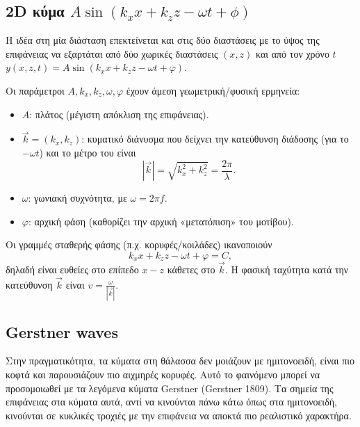\documentclass[a4paper, 11pt]{article}
\begin{document}
\subsection{\texorpdfstring{2D κύμα
\(A\sin(k_x x + k_z z - \omega t + \phi)\)}{2D κύμα A\textbackslash sin(k\_x x + k\_z z - \textbackslash omega t + \textbackslash phi)}}\label{d-ux3baux3cdux3bcux3b1-asink_x-x-k_z-z---omega-t-phi}

Η ιδέα στη μία διάσταση επεκτείνεται και στις δύο διαστάσεις με το ύψος
της επιφάνειας να εξαρτάται από δύο χωρικές διαστάσεις \((x,z)\) και από
τον χρόνο \(t\) \(y(x,z,t)=A\sin(k_x x + k_z z - \omega t + \varphi)\).

Οι παράμετροι \(A, k_x, k_z, \omega, \varphi\) έχουν άμεση
γεωμετρική/φυσική ερμηνεία:

\begin{itemize}
\item
  \(A\): πλάτος (μέγιστη απόκλιση της επιφάνειας).
\item
  \(\vec{k}=(k_x,k_z)\): κυματικό διάνυσμα που δείχνει την κατεύθυνση
  διάδοσης (για το \(-\omega t\)) και το μέτρο του είναι \[
  |\vec{k}|=\sqrt{k_x^2+k_z^2}=\frac{2\pi}{\lambda}.
  \]
\item
  \(\omega\): γωνιακή συχνότητα, με \(\omega=2\pi f\).
\item
  \(\varphi\): αρχική φάση (καθορίζει την αρχική «μετατόπιση» του
  μοτίβου).
\end{itemize}

Οι γραμμές σταθερής φάσης (π.χ. κορυφές/κοιλάδες) ικανοποιούν \[
k_x x + k_z z - \omega t + \varphi = C,
\] δηλαδή είναι ευθείες στο επίπεδο \(x\!-\!z\) κάθετες στο \(\vec{k}\).
Η φασική ταχύτητα κατά την κατεύθυνση \(\vec{k}\) είναι
\(v=\frac{\omega}{|\vec{k}|}\).

\subsection{Gerstner waves}\label{gerstner-waves}

Στην πραγματικότητα, τα κύματα στη θάλασσα δεν μοιάζουν με ημιτονοειδή,
είναι πιο κοφτά και παρουσιάζουν πιο αιχμηρές κορυφές. Αυτό το φαινόμενο
μπορεί να προσομοιωθεί με τα λεγόμενα κύματα Gerstner (Gerstner 1809).
Τα σημεία της επιφάνειας στα κύματα αυτά, αντί να κινούνται πάνω κάτω
όπως στα ημιτονοειδή, κινούνται σε κυκλικές τροχιές με την επιφάνεια να
αποκτά πιο ρεαλιστικό χαρακτήρα.
\end{document}
